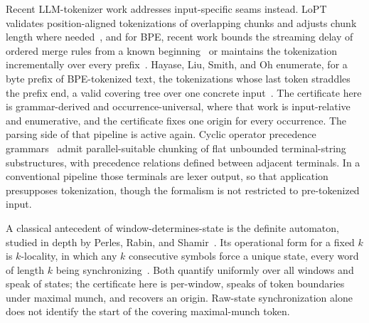 \documentclass[11pt,a4paper]{article}
\theoremstyle{definition}
\theoremstyle{plain}
\begin{document}
Recent LLM-tokenizer work addresses input-specific seams instead. LoPT validates position-aligned tokenizations of
overlapping chunks and adjusts chunk length where needed~\cite{shao2026lopt}, and for BPE, recent work bounds the
streaming delay of ordered merge rules from a known beginning~\cite{mamouras2026bpedelay} or maintains the tokenization
incrementally over every prefix~\cite{jiang2026incremental}. Hayase, Liu, Smith, and Oh enumerate, for a byte prefix of
BPE-tokenized text, the tokenizations whose last token straddles the prefix end, a valid covering tree over one concrete
input~\cite{hayase2025bytesampler}. The certificate here is grammar-derived and occurrence-universal, where that work is
input-relative and enumerative, and the certificate fixes one origin for every occurrence. The parsing side of that
pipeline is active again. Cyclic operator precedence grammars~\cite{chiari2025cyclic} admit parallel-suitable chunking
of flat unbounded terminal-string substructures, with precedence relations defined between adjacent terminals. In a
conventional pipeline those terminals are lexer output, so that application presupposes tokenization, though the
formalism is not restricted to pre-tokenized input.

A classical antecedent of window-determines-state is the definite automaton, studied in depth by Perles, Rabin, and
Shamir~\cite{perles1963definite}. Its operational form for a fixed $k$ is $k$-locality, in which any $k$ consecutive
symbols force a unique state, every word of length $k$ being synchronizing~\cite{holub2009parallel}. Both quantify
uniformly over all windows and speak of states; the certificate here is per-window, speaks of token boundaries under
maximal munch, and recovers an origin. Raw-state synchronization alone does not identify the start of the covering
maximal-munch token.
\end{document}
